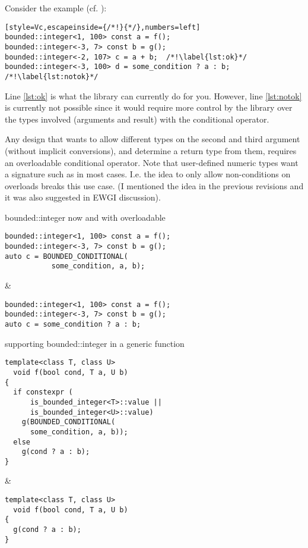 Consider the  example (cf. \cite{site.bounded-integer}):
\smallskip\begin{lstlisting}[style=Vc,escapeinside={/*!}{*/},numbers=left]
bounded::integer<1, 100> const a = f();
bounded::integer<-3, 7> const b = g();
bounded::integer<-2, 107> c = a + b;  /*!\label{lst:ok}*/
bounded::integer<-3, 100> d = some_condition ? a : b;  /*!\label{lst:notok}*/
\end{lstlisting}

Line \ref{lst:ok} is what the  library can currently do for you.
However, line \ref{lst:notok} is currently not possible since it would require more control by the library over the types involved (arguments and result) with the conditional operator.

Any design that wants to allow different types on the second and third argument (without implicit conversions), and determine a return type from them, requires an overloadable conditional operator.
Note that user-defined numeric types want a signature such as  in most cases.
I.e. the idea to only allow non-\bool conditions on  overloads breaks this use case.
(I mentioned the idea in the previous revisions and it was also suggested in EWGI discussion).

\begin{tonytable}
{bounded::integer now and with overloadable }
\begin{lstlisting}[style=Vc]
bounded::integer<1, 100> const a = f();
bounded::integer<-3, 7> const b = g();
auto c = BOUNDED_CONDITIONAL(
           some_condition, a, b);
\end{lstlisting}
&
\begin{lstlisting}[style=Vc]
bounded::integer<1, 100> const a = f();
bounded::integer<-3, 7> const b = g();
auto c = some_condition ? a : b;
\end{lstlisting}
\end{tonytable}

\begin{tonytable}
{supporting bounded::integer in a generic function}
\begin{lstlisting}[style=Vc]
template<class T, class U>
  void f(bool cond, T a, U b)
{
  if constexpr (
      is_bounded_integer<T>::value ||
      is_bounded_integer<U>::value)
    g(BOUNDED_CONDITIONAL(
      some_condition, a, b));
  else
    g(cond ? a : b);
}
\end{lstlisting}
&
\begin{lstlisting}[style=Vc]
template<class T, class U>
  void f(bool cond, T a, U b)
{
  g(cond ? a : b);
}
\end{lstlisting}
\end{tonytable}

